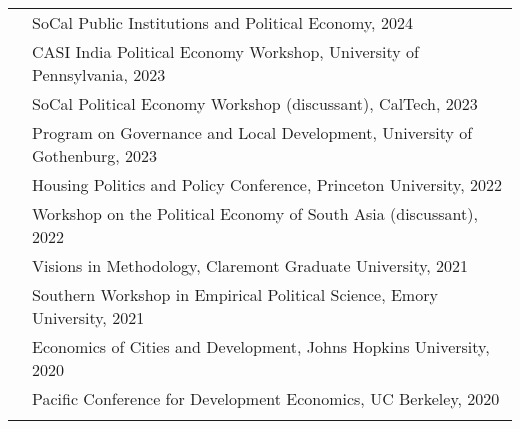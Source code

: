 \documentclass[letterpaper, 10.5pt]{article}
\begin{document}
\begin{longtable}{p{1.5in}p{5in}}
& SoCal Public Institutions and Political Economy, 2024\\ & CASI India Political Economy Workshop, University of Pennsylvania, 2023\\     

&SoCal Political Economy Workshop (discussant), CalTech, 2023\\
 &Program on Governance and Local Development, University of Gothenburg, 2023\\

           &Housing Politics and Policy Conference, Princeton University, 2022\\
 & Workshop on the Political Economy of South Asia (discussant), 2022\\        



  & Visions in Methodology, Claremont Graduate University, 2021 \\
  
    &Southern Workshop in Empirical Political Science, Emory University, 2021 \\
 

 & Economics of Cities and Development, Johns Hopkins University, 2020\\
 & Pacific Conference for Development Economics, UC Berkeley, 2020 \\
 &\\


% 
 

\end{longtable}
\end{document}
